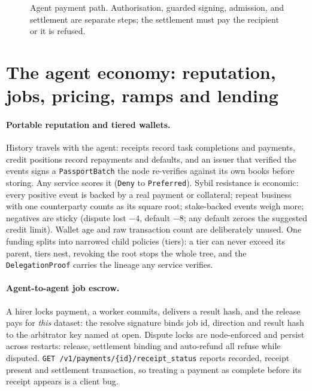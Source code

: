 \documentclass{article}
\begin{document}
\begin{figure}[htbp]
\centering
{}
\caption{Agent payment path. Authorisation, guarded signing, admission, and
settlement are separate steps; the settlement must pay the recipient or it is
refused.}
\label{fig:payflow}
\end{figure}

\section{The agent economy: reputation, jobs, pricing, ramps and lending}
\label{sec:agent-economy}

\paragraph{Portable reputation and tiered wallets.} History travels with the
agent: receipts record task completions and payments, credit positions record
repayments and defaults, and an issuer that verified the events signs a
\texttt{PassportBatch} the node re-verifies against its own books before
storing. Any service scores it (\texttt{Deny} to \texttt{Preferred}). Sybil
resistance is economic: every positive event is backed by a real payment or
collateral; repeat business with one counterparty counts as its square root;
stake-backed events weigh more; negatives are sticky (dispute lost $-4$,
default $-8$; any default zeroes the suggested credit limit). Wallet age and raw
transaction count are deliberately unused. One funding splits into narrowed child
policies (tiers): a tier can never exceed its parent, tiers nest, revoking the
root stops the whole tree, and the \texttt{DelegationProof} carries the lineage
any service verifies.

\paragraph{Agent-to-agent job escrow.} A hirer locks payment, a worker commits,
delivers a result hash, and the release pays for \emph{this} dataset: the
resolve signature binds job id, direction and result hash to the arbitrator key
named at open. Dispute locks are node-enforced and persist across restarts:
release, settlement binding and auto-refund all refuse while disputed.
\texttt{GET /v1/payments/\{id\}/receipt\_status} reports recorded, receipt
present and settlement transaction, so treating a payment as complete before its
receipt appears is a client bug.
\end{document}
